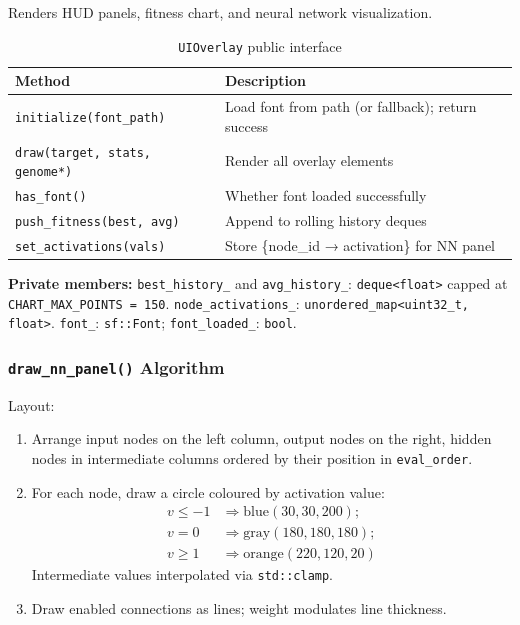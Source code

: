 Renders HUD panels, fitness chart, and neural network visualization.

\begin{table}[H]
\centering\small
\caption{\texttt{UIOverlay} public interface}
\begin{tabularx}{\textwidth}{@{}lX@{}}
\toprule
\textbf{Method} & \textbf{Description} \\
\midrule
\texttt{initialize(font\_path)} & Load font from path (or fallback); return success \\
\texttt{draw(target, stats, genome*)} & Render all overlay elements \\
\texttt{has\_font()} & Whether font loaded successfully \\
\texttt{push\_fitness(best, avg)} & Append to rolling history deques \\
\texttt{set\_activations(vals)} & Store \{node\_id → activation\} for NN panel \\
\bottomrule
\end{tabularx}
\end{table}

\textbf{Private members:}
\texttt{best\_history\_} and \texttt{avg\_history\_}: \texttt{deque<float>} capped at
\texttt{CHART\_MAX\_POINTS = 150}.
\texttt{node\_activations\_}: \texttt{unordered\_map<uint32\_t, float>}.
\texttt{font\_}: \texttt{sf::Font}; \texttt{font\_loaded\_}: \texttt{bool}.

\subsubsection{\texttt{draw\_nn\_panel()} Algorithm}

Layout:
\begin{enumerate}[nosep]
  \item Arrange input nodes on the left column, output nodes on the right, hidden nodes
    in intermediate columns ordered by their position in \texttt{eval\_order}.
  \item For each node, draw a circle coloured by activation value:
    \[
      \begin{aligned}
        v \le -1 &\Rightarrow \text{blue}(30,30,200); \\
        v = 0   &\Rightarrow \text{gray}(180,180,180); \\
        v \ge 1 &\Rightarrow \text{orange}(220,120,20)
      \end{aligned}
    \]
    Intermediate values interpolated via \texttt{std::clamp}.
  \item Draw enabled connections as lines; weight modulates line thickness.
\end{enumerate}

